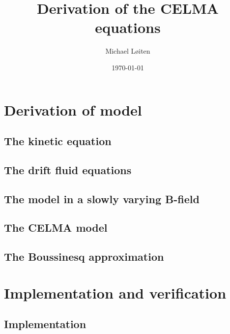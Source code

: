 \documentclass[12pt,a4paper,oneside,openright]{report} %
\title{\vspace{-8ex}Derivation of the CELMA equations\vspace{-1ex}}
\author{Michael L{\o}iten}
\date{\vspace{-2ex}\today}
\begin{document}
\maketitle
%
\part{Derivation of model}
\chapter{The kinetic equation}

%
\chapter{The drift fluid equations}
\label{chap:drift-order}


\chapter{The model in a slowly varying B-field}


\chapter{The CELMA model}
\label{chap:CELMA}






\chapter{The Boussinesq approximation}


\part{Implementation and verification}
\chapter{Implementation}
\label{chap:implementation}





\end{document}
